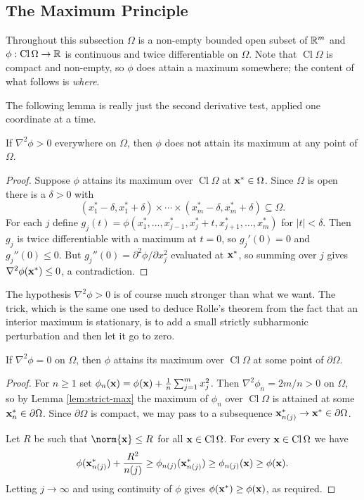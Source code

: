 \documentclass[a4paper]{scrartcl}
\newcommand{\Cl}{\operatorname{Cl}}
\begin{document}
\subsection{The Maximum Principle}

Throughout this subsection $\Omega$ is a non-empty bounded open subset of $\mathbb{R}^m$ and $\phi : \Cl \Omega \to \R$ is continuous and twice differentiable on $\Omega$. Note that $\Cl\Omega$ is compact and non-empty, so $\phi$ does attain a maximum somewhere; the content of what follows is \emph{where}.

The following lemma is really just the second derivative test, applied one coordinate at a time.

\begin{lemma}\label{lem:strict-max}
	If $\nabla^2 \phi > 0$ everywhere on $\Omega$, then $\phi$ does not attain its maximum at any point of $\Omega$.
\end{lemma}

\begin{proof}
	Suppose $\phi$ attains its maximum over $\Cl\Omega$ at $\mathbf{x}^* \in \Omega$. Since $\Omega$ is open there is a $\delta>0$ with
	$$(x_1^*-\delta, x_1^*+\delta) \times \cdots \times (x_m^*-\delta,x_m^*+\delta) \subseteq \Omega.$$
	For each $j$ define $g_j(t) = \phi(x_1^*, \ldots, x_{j-1}^*, x_j^*+t, x_{j+1}^*,\ldots,x_m^*)$ for $|t|<\delta$. Then $g_j$ is twice differentiable with a maximum at $t=0$, so $g_j'(0) = 0$ and $g_j''(0) \leq 0$. But $g_j''(0) = \partial^2\phi/\partial x_j^2$ evaluated at $\mathbf{x}^*$, so summing over $j$ gives $\nabla^2\phi(\mathbf{x}^*) \leq 0$, a contradiction.
\end{proof}

The hypothesis $\nabla^2 \phi > 0$ is of course much stronger than what we want. The trick, which is the same one used to deduce Rolle's theorem from the fact that an interior maximum is stationary, is to add a small strictly subharmonic perturbation and then let it go to zero.

\begin{theorem}\label{thm:max-principle}
	If $\nabla^2 \phi = 0$ on $\Omega$, then $\phi$ attains its maximum over $\Cl\Omega$ at some point of $\partial\Omega$.
\end{theorem}

\begin{proof}
	For $n \geq 1$ set $\phi_n(\mathbf{x}) = \phi(\mathbf{x}) + \tfrac{1}{n}\sum_{j=1}^m x_j^2$. Then $\nabla^2 \phi_n = 2m/n > 0$ on $\Omega$, so by Lemma \ref{lem:strict-max} the maximum of $\phi_n$ over $\Cl\Omega$ is attained at some $\mathbf{x}_n^* \in \partial\Omega$. Since $\partial \Omega$ is compact, we may pass to a subsequence $\mathbf{x}_{n(j)}^* \to \mathbf{x}^* \in \partial\Omega$.

	Let $R$ be such that $\norm{\vv{x}} \leq R$ for all $\vv{x} \in \Cl\Omega$. For every $\vv{x} \in \Cl\Omega$ we have
	$$\phi(\mathbf{x}_{n(j)}^*) + \frac{R^2}{n(j)} \geq \phi_{n(j)}(\mathbf{x}_{n(j)}^*) \geq \phi_{n(j)}(\mathbf{x}) \geq \phi(\mathbf{x}).$$
	Letting $j \to \infty$ and using continuity of $\phi$ gives $\phi(\mathbf{x}^*) \geq \phi(\mathbf{x})$, as required.
\end{proof}
\end{document}
